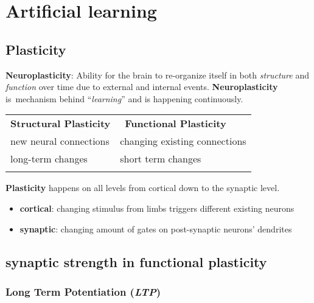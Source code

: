 \documentclass[
    fontsize      = 11pt,
    paper         = a4,
    twoside       = false,
    parskip       = half,
    pagesize      = false,
]{scrartcl}
\author{Robin Prillwitz}
\date{11. August 2022}
\providecommand{\tightlist}{%
  \setlength{\itemsep}{0pt}\setlength{\parskip}{0pt}}
\begin{document}
\hypertarget{artificial-learning}{%
\section{Artificial learning}\label{artificial-learning}}

\hypertarget{plasticity}{%
\subsection{Plasticity}\label{plasticity}}

\textbf{Neuroplasticity}: Ability for the brain to re-organize itself in
both \emph{structure} and \emph{function} over time due to external and
internal events. \textbf{Neuroplasticity} is~mechanism behind
``\emph{learning}'' and is happening continuously.

\begin{longtable}[]{@{}ll@{}}
\toprule
\textbf{Structural Plasticity} & ~\textbf{Functional
Plasticity} \\ \addlinespace
\midrule
\endhead
new neural connections & changing existing connections \\ \addlinespace
long-term changes & short term changes \\ \addlinespace
\bottomrule
\end{longtable}

\textbf{Plasticity} happens on all levels from cortical down to the
synaptic level.

\begin{itemize}
\tightlist
\item
  \textbf{cortical}: changing stimulus from limbs triggers different
  existing neurons
\item
  \textbf{synaptic}: changing amount of gates on post-synaptic neurons'
  dendrites
\end{itemize}

\hypertarget{synaptic-strength-in-functional-plasticity}{%
\subsection{\texorpdfstring{\textbf{synaptic strength} in functional
plasticity}{synaptic strength in functional plasticity}}\label{synaptic-strength-in-functional-plasticity}}

\hypertarget{long-term-potentiation-ltp}{%
\subsubsection{\texorpdfstring{Long Term Potentiation
(\emph{LTP})}{Long Term Potentiation (LTP)}}\label{long-term-potentiation-ltp}}
\end{document}

